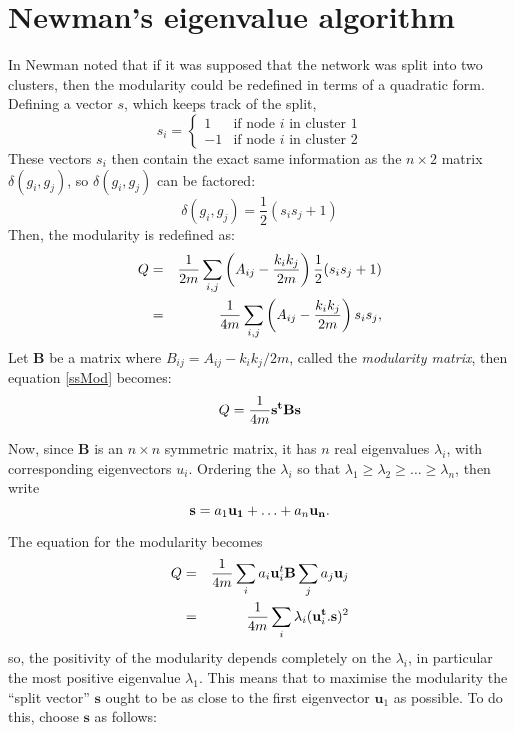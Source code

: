 \section{Newman's eigenvalue algorithm}

In \citep{Newman2006a,Newman2006b} Newman noted that if it was supposed that the network was 
split into two clusters, then the modularity could be redefined in terms of a
quadratic form.  Defining a vector $s$, which keeps track of the
split,
\begin{equation}
s_i = \left\{ \begin{array}{ll} 1 & \mbox{if node $i$ in cluster 1}
  \\ -1 & \mbox{if node $i$ in cluster 2}\end{array} \right.
\end{equation}
These vectors $s_i$ then contain the exact same information as the $n\times 2$ matrix $\delta (g_i,g_j)$, so $\delta (g_i,g_j) $ can be factored:
\begin{equation}
\delta (g_i,g_j) = \frac{1}{2} \left( s_i s_j + 1 \right)
\end{equation}
Then, the modularity is redefined as:
\begin{eqnarray} \label{ssMod}
Q & = & \frac{1}{2m}\sum_{i,j} \left(A_{ij} - \frac{k_ik_j}{2m}\right)\frac{1}{2}(s_is_j + 1)\cr
& = &\frac{1}{4m}\sum_{i,j} \left(A_{ij} - \frac{k_ik_j}{2m}\right)s_is_j,
\end{eqnarray}
Let $\mathbf{B}$ be a matrix where 
$B_{ij} = A_{ij} - k_ik_j/2m$, called the \emph{modularity matrix}, 
then equation \ref{ssMod} becomes:
\begin{equation}
Q = \frac{1}{4m}{\bf s^tBs}
\end{equation}

Now, since $\mathbf{B}$ is an $n\times n$ symmetric matrix, it has $n$ real eigenvalues $\lambda_i$, with corresponding
eigenvectors $u_i$.  Ordering the $\lambda_i$ so that $
\lambda_1 \geq \lambda_2 \geq \ldots \geq \lambda_n$, then write 
\begin{equation}
{\bf s} = a_1{\bf u_1}+ \ldots + a_n{\bf u_n}.
\end{equation}


The equation for the modularity becomes
\begin{eqnarray}
Q & = & \frac{1}{4m} \sum_{i} a_i{\bf u}_i^t{\bf B}\sum_ja_j{\bf u}_j\cr
& = & \frac{1}{4m} \sum_i \lambda_i ({\bf u}_i^{\bf t}.{\bf s})^2
\end{eqnarray}
so, the positivity of the modularity depends completely on the $\lambda_i$, in 
particular the most positive eigenvalue $\lambda_1$.  This means that to 
maximise the modularity the ``split vector'' $\mathbf{s}$ ought to be 
as close to the first eigenvector $\mathbf{u}_1$ as possible. To do this, 
choose $\mathbf{s}$ as follows:

